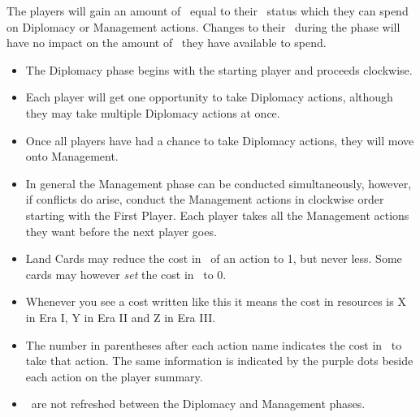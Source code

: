 \documentclass[10pt,twocolumn]{article}
\begin{document}

The players will gain an amount of \polf\ equal to their \pol\ status which they can spend on Diplomacy or Management actions. Changes to their \pol\ during the phase will have no impact on the amount of \polf\ they have available to spend.
\begin{itemize}
\item The Diplomacy phase begins with the starting player and proceeds clockwise.
\item Each player will get one opportunity to take Diplomacy actions, although they may take multiple Diplomacy actions at once.
\item Once all players have had a chance to take Diplomacy actions, they will move onto Management.
\item In general the Management phase can be conducted simultaneously, however, if conflicts do arise, conduct the Management actions in clockwise order starting with the First Player. Each player takes all the Management actions they want before the next player goes.
\item Land Cards may reduce the cost in \polf\ of an action to 1, but never less. Some cards may however \textit{set} the cost in \polf\ to 0.
\item Whenever you see a cost written like this  it means the cost in resources is X in Era I, Y in Era II and Z in Era III.
\item The number in parentheses after each action name indicates the cost in \polf\ to take that action. The same information is indicated by the purple dots beside each action on the player summary.
\item \polf\ are not refreshed between the Diplomacy and Management phases.
\end{itemize}
\end{document}

